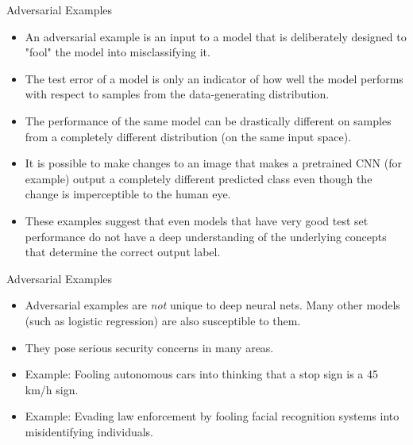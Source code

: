  \begin{frame} {Adversarial Examples}
   \begin{itemize}
     \item An adversarial example is an input to a model that is deliberately designed to "fool" the model into misclassifying it.
     \item The test error of a model is only an indicator of how well the model performs with respect to samples from the data-generating distribution.
     \item The performance of the same model can be drastically different on samples from a completely different distribution (on the same input space).
      \item It is possible to make changes to an image that makes a pretrained CNN (for example) output a completely different predicted class even though the change is imperceptible to the human eye.
     \item These examples suggest that even models that have very good test set performance do not have a deep understanding of the underlying concepts that determine the correct output label.
     \end{itemize}
    \end{frame}
    
  \begin{frame} {Adversarial Examples}
    \begin{itemize}
      \item Adversarial examples are \textit{not} unique to deep neural nets. Many other models (such as logistic regression) are also susceptible to them.
      \item They pose serious security concerns in many areas.
      \item Example: Fooling autonomous cars into thinking that a stop sign is a 45 km/h sign.
      \item Example: Evading law enforcement by fooling facial recognition systems into misidentifying individuals.
   \end{itemize}
 \end{frame}
 
